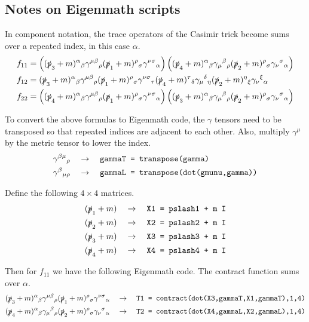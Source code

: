 \documentclass[12pt]{article}
\begin{document}
\subsection*{Notes on Eigenmath scripts}
In component notation, the trace operators of the Casimir trick become sums over
a repeated index, in this case $\alpha$.
\begin{align*}
f_{11}&=
\left(
(\slashed{p}_3+m)^\alpha{}_\beta
\gamma^{\mu\beta}{}_\rho
(\slashed{p}_1+m)^\rho{}_\sigma
\gamma^{\nu\sigma}{}_\alpha
\right)
\left(
(\slashed{p}_4+m)^\alpha{}_\beta
\gamma_\mu{}^\beta{}_\rho
(\slashed{p}_2+m)^\rho{}_\sigma
\gamma_\nu{}^\sigma{}_\alpha
\right)
\\
f_{12}&=
(\slashed{p}_3+m)^\alpha{}_\beta
\gamma^{\mu\beta}{}_\rho
(\slashed{p}_1+m)^\rho{}_\sigma
\gamma^{\nu\sigma}{}_\tau
(\slashed{p}_4+m)^\tau{}_\delta
\gamma_\mu{}^\delta{}_\eta
(\slashed{p}_2+m)^\eta{}_\xi
\gamma_\nu{}^\xi{}_\alpha
\\
f_{22}&=
\left(
(\slashed{p}_4+m)^\alpha{}_\beta
\gamma^{\mu\beta}{}_\rho
(\slashed{p}_1+m)^\rho{}_\sigma
\gamma^{\nu\sigma}{}_\alpha
\right)
\left(
(\slashed{p}_3+m)^\alpha{}_\beta
\gamma_\mu{}^\beta{}_\rho
(\slashed{p}_2+m)^\rho{}_\sigma
\gamma_\nu{}^\sigma{}_\alpha
\right)
\end{align*}

\noindent
To convert the above formulas to Eigenmath code,
the $\gamma$ tensors need to be transposed
so that repeated indices are adjacent to each other.
Also, multiply $\gamma^\mu$ by the metric tensor to lower the index.
\begin{align*}
\gamma^{\beta\mu}{}_\rho\quad&\rightarrow\quad
\text{\tt gammaT = transpose(gamma)}\\
\gamma^\beta{}_{\mu\rho}\quad&\rightarrow\quad
\text{\tt gammaL = transpose(dot(gmunu,gamma))}
\end{align*}

\noindent
Define the following $4\times4$ matrices.
\begin{align*}
(\slashed{p}_1+m)\quad&\rightarrow\quad\text{\tt X1 = pslash1 + m I}\\
(\slashed{p}_2+m)\quad&\rightarrow\quad\text{\tt X2 = pslash2 + m I}\\
(\slashed{p}_3+m)\quad&\rightarrow\quad\text{\tt X3 = pslash3 + m I}\\
(\slashed{p}_4+m)\quad&\rightarrow\quad\text{\tt X4 = pslash4 + m I}
\end{align*}

\noindent
Then for $f_{11}$ we have the following Eigenmath code.
The contract function sums over $\alpha$.
\begin{align*}
(\slashed{p}_3+m)^\alpha{}_\beta
\gamma^{\mu\beta}{}_\rho
(\slashed{p}_1+m)^\rho{}_\sigma
\gamma^{\nu\sigma}{}_\alpha
\quad&\rightarrow\quad
\text{\tt T1 = contract(dot(X3,gammaT,X1,gammaT),1,4)}
\\
(\slashed{p}_4+m)^\alpha{}_\beta
\gamma_\mu{}^\beta{}_\rho
(\slashed{p}_2+m)^\rho{}_\sigma
\gamma_\nu{}^\sigma{}_\alpha
\quad&\rightarrow\quad
\text{\tt T2 = contract(dot(X4,gammaL,X2,gammaL),1,4)}
\end{align*}
\end{document}
